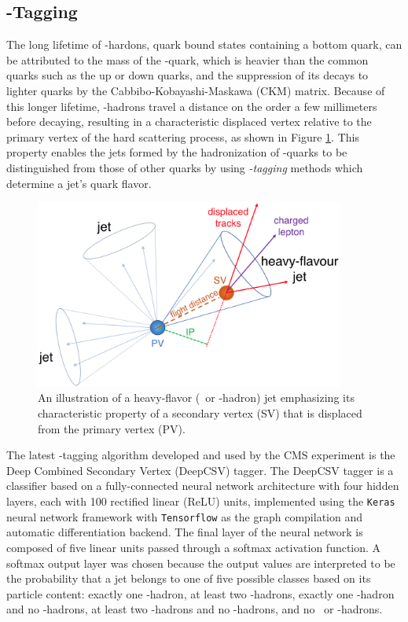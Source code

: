 \subsection{\qrkb-Tagging} \label{btagging}

The long lifetime of \qrkb-hardons, quark bound states containing a bottom quark, can be attributed to the mass of the \qrkb-quark, which is heavier than the common quarks such as the up or down quarks, and the suppression of its decays to lighter quarks by the Cabbibo-Kobayashi-Maskawa (CKM) matrix. Because of this longer lifetime, \qrkb-hadrons travel a distance on the order a few millimeters before decaying, resulting in a characteristic displaced vertex relative to the primary vertex of the hard scattering process, as shown in Figure \ref{fig:secondary_vertex}. This property enables the jets formed by the hadronization of \qrkb-quarks to be distinguished from those of other quarks by using \textit{\qrkb-tagging} methods which determine a jet's quark flavor.

\begin{figure}[htbp]
  \centering
    \includegraphics[width=4in]{images/secondary_vertex}
    \caption[Illustration of a Heavy-Flavor Jet]{An illustration of a heavy-flavor (\qrkc\ or \qrkb-hadron) jet emphasizing its characteristic property of a secondary vertex (SV) that is displaced from the primary vertex (PV).\cite{CMSBTAG}}
    \label{fig:secondary_vertex}
\end{figure}

The latest \qrkb-tagging algorithm developed and used by the CMS experiment is the Deep Combined Secondary Vertex (DeepCSV)\cite{CMSBTAG} tagger. The DeepCSV tagger is a classifier based on a fully-connected neural network architecture with four hidden layers, each with 100 rectified linear (ReLU) units, implemented using the \texttt{Keras}\cite{KERAS} neural network framework with \texttt{Tensorflow}\cite{TENSORFLOW} as the graph compilation and automatic differentiation backend. The final layer of the neural network is composed of five linear units passed through a softmax activation function. A softmax output layer was chosen because the output values are interpreted to be the probability that a jet belongs to one of five possible classes based on its particle content: exactly one \qrkb-hadron, at least two \qrkb-hadrons, exactly one \qrkc-hadron and no \qrkb-hadrons, at least two \qrkc-hadrons and no \qrkb-hadrons, and no \qrkc\ or \qrkb-hadrons.

